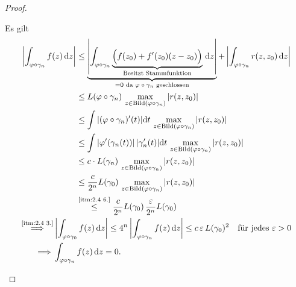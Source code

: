 \begin{theorem}
\begin{proof}
\begin{enum-arab}
      \item 
        Es gilt
      \begin{gather*}
        \begin{aligned}
          \left| \int_{\varphi \circ \gamma_n} f(z) \, \mathrm{d}z \right|
          &\leq \underbrace{\left| \int_{\varphi \circ \gamma_n} \underbrace{\Big(f(z_0) + f'(z_0) (z-z_0)\Big)}_{\text{Besitzt Stammfunktion}} \, \mathrm{d}z \right|}_{=0 \text{ da $\varphi \circ \gamma_n$ geschlossen}}
          + \left| \int_{\varphi \circ \gamma_n} r(z,z_0) \, \mathrm{d}z \right| \\
          &\leq L(\varphi \circ \gamma_n)
          \, \max\limits_{z \in \mathrm{Bild}(\varphi \circ \gamma_n)} |r(z,z_0)| \\
          &\leq \int |(\varphi \circ \gamma_n)'(t)| \mathrm{d}t
          \, \max\limits_{z \in \mathrm{Bild}(\varphi \circ \gamma_n)} |r(z,z_0)| \\
          &\leq \int |\varphi'(\gamma_n(t))| \, |\gamma_n'(t)| \mathrm{d}t
          \, \max\limits_{z \in \mathrm{Bild}(\varphi \circ \gamma_n)} |r(z,z_0)| \\
          &\leq c \cdot L(\gamma_n)
          \, \max\limits_{z \in \mathrm{Bild}(\varphi \circ \gamma_n)} |r(z,z_0)| \\
          &\leq \frac{c}{2^n} L(\gamma_0)
          \, \max\limits_{z \in \mathrm{Bild}(\varphi \circ \gamma_n)} |r(z,z_0)| \\
          &\overset{\text{\ref{itm:2.4 6.}}}{\leq} \frac{c}{2^n} L(\gamma_0) \, \frac{\varepsilon}{2^n} L(\gamma_0) \\
        \end{aligned} \\
        \begin{aligned}
          \overset{\text{\ref{itm:2.4 3.}}}{\implies}& \left| \int_{\varphi \circ \gamma_0} f(z) \, \mathrm{d}z \right|
          \leq 4^n \left| \int_{\varphi \circ \gamma_n} f(z) \, \mathrm{d}z \right| \leq c \, \varepsilon \, L(\gamma_0)^2 \quad \text{für jedes } \varepsilon > 0 \\
          \implies& \int_{\varphi \circ \gamma_n} f(z) \, \mathrm{d}z = 0.
        \end{aligned}
      \end{gather*}
    \end{enum-arab}
  \end{proof}
\end{theorem}

